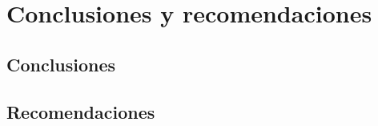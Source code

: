 
\chapter{Conclusiones y recomendaciones}
\label{cap:conclusiones}


\section{Conclusiones}
\label{sec:conclusiones}


\section{Recomendaciones}
\label{sec:recomendaciones}

